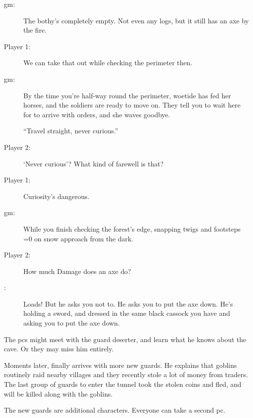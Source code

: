 \begin{multicols}{3}

\begin{description}\sf
  \item[\Gls{gm}:]
  The \gls{bothy}'s completely empty.
  Not even any logs, but it still has an axe by the fire.
  \item[Player 1:]
  We can take that out while checking the perimeter then.
  \item[\Gls{gm}:]
  By the time you're half-way round the perimeter, \gls{woetide} has fed her horses, and the \glspl{soldier} are ready to move on.
  They tell you to wait here for  to arrive with orders, and she waves goodbye.

  ``Travel straight, never curious.''
  \item[Player 2:]
  `Never curious'?
  What kind of farewell is that?
  \item[Player 1:]
  Curiosity's dangerous.

  \item[\Gls{gm}:]
  While you finish checking the forest's edge, snapping twigs and footsteps
  \ifnum\value{temperature}=0%
    on snow
  \fi%
  approach from the dark.
  \item[Player 2:]
  How much Damage does an axe do?
  \item[\Glsentrytext{gm}:]
  Loads!
  But he asks you not to.
  He asks you to put the axe down.
  He's holding a sword, and dressed in the same black cassock you have and asking you to put the axe down.
\end{description}

\bigLine\nobreak
\vspace{2em}
\noindent
The \glspl{pc} might meet with the \gls{guard} deserter, and learn what he knows about the cave.
Or they may miss him entirely.

Moments later,  finally arrives with more new \glspl{guard}.
He explains that goblins routinely raid nearby \glspl{village} and they recently stole a lot of money from traders.
The last group of \glspl{guard} to enter the tunnel took the stolen \glspl{coin} and fled, and will be killed along with the goblins.

The new \glspl{guard} are additional characters.
Everyone can take a second \gls{pc}.

\end{multicols}
